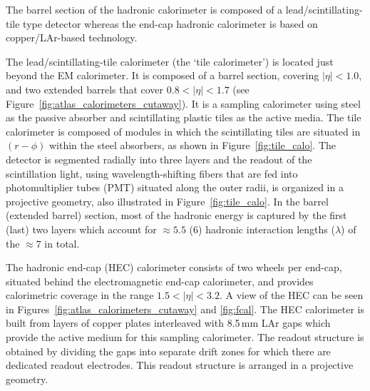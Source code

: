 The barrel section of the hadronic calorimeter is composed of a
lead/scintillating-tile type detector whereas the end-cap hadronic
calorimeter is based on copper/LAr-based technology.

The lead/scintillating-tile calorimeter (the `tile calorimeter') is located just beyond
the EM calorimeter.
It is composed of a barrel section, covering $\lvert \eta \rvert < 1.0$,
and two extended barrels that cover $0.8 < \lvert \eta \rvert < 1.7$ (see Figure~\ref{fig:atlas_calorimeters_cutaway}).
It is a sampling calorimeter using steel as the passive absorber and scintillating
plastic tiles as the active media.
The tile calorimeter is composed of modules in which the scintillating
tiles are situated in $(r-\phi)$ within the steel absorbers, as shown in Figure~\ref{fig:tile_calo}.
The detector is segmented radially into three layers and the readout of the
scintillation light, using wavelength-shifting fibers that are fed into photomultiplier tubes (PMT)
situated along the outer radii, is organized in a projective
geometry, also illustrated in Figure~\ref{fig:tile_calo}.
In the barrel (extended barrel) section, most of the hadronic energy is captured by the first (last) two
layers which account for $\approx 5.5$ ($6$) hadronic interaction lengths ($\lambda$)
of the $\approx 7$ in total.

The hadronic end-cap (HEC) calorimeter consists of two wheels per end-cap, situated
behind the electromagnetic end-cap calorimeter, and
provides calorimetric coverage in the range $1.5 < \lvert \eta \rvert <3.2$.
A view of the HEC can be seen in Figures~\ref{fig:atlas_calorimeters_cutaway} and \ref{fig:fcal}.
The HEC calorimeter is built from layers of copper plates interleaved with 8.5\,mm LAr gaps
which provide the active medium for this sampling calorimeter.
The readout structure is obtained by dividing the gaps into separate drift zones for
which there are dedicated readout electrodes.
This readout structure is arranged in a projective geometry.

